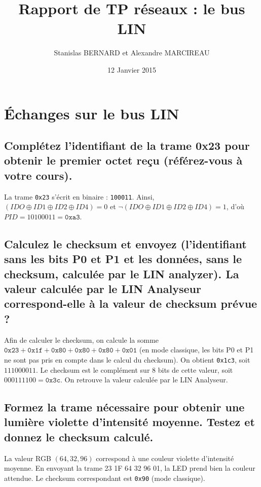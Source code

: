 \documentclass[12pt]{article}
\title{Rapport de TP réseaux : le bus LIN}
\author{Stanislas BERNARD et Alexandre MARCIREAU}
\date{12 Janvier 2015}
\begin{document}
\setlength{\unitlength}{1cm}

\maketitle

\setcounter{section}{1}
\section{Échanges sur le bus LIN}

\subsection{Complétez l'identifiant de la trame 0x23 pour obtenir le premier octet reçu (référez-vous à votre cours).}

La trame \texttt{0x23} s'écrit en binaire : \texttt{100011}. Ainsi, $(IDO \oplus ID1 \oplus ID2 \oplus ID4) = 0$ et $\lnot(IDO \oplus ID1 \oplus ID2 \oplus ID4) = 1$, d'où $PID = 10100011 = \texttt{0xa3}$.

\subsection{Calculez le checksum et envoyez (l'identifiant sans les bits P0 et P1 et les données, sans le checksum, calculée par le LIN analyzer). La valeur calculée par le LIN Analyseur correspond-elle à la valeur de checksum prévue ?}

Afin de calculer le checksum, on calcule la somme $\texttt{0x23} + \texttt{0x1f} + \texttt{0x80} + \texttt{0x80} + \texttt{0x80} + \texttt{0x01}$ (en mode classique, les bits P0 et P1 ne sont pas pris en compte dans le calcul du checksum). On obtient \texttt{0x1c3}, soit $111000011$. Le checksum est le complément sur 8 bits de cette valeur, soit $000111100 = \texttt{0x3c}$. On retrouve la valeur calculée par le LIN Analyseur.

\subsection{Formez la trame nécessaire pour obtenir une lumière violette d'intensité moyenne. Testez et donnez le checksum calculé.}

La valeur RGB $(64, 32, 96)$ correspond à une couleur violette d'intensité moyenne. En envoyant la trame 23 1F 64 32 96 01, la LED prend bien la couleur attendue. Le checksum correspondant est \texttt{0x90} (mode classique).
\end{document}
